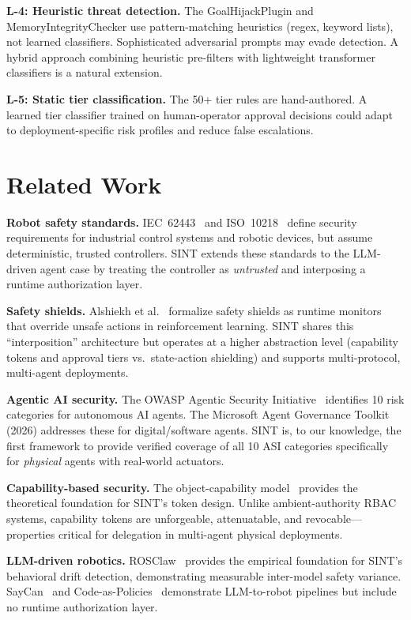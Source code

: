 \documentclass[conference]{IEEEtran}
\begin{document}
\textbf{L-4: Heuristic threat detection.}
The GoalHijackPlugin and MemoryIntegrityChecker use pattern-matching heuristics
(regex, keyword lists), not learned classifiers.
Sophisticated adversarial prompts may evade detection.
A hybrid approach combining heuristic pre-filters with lightweight transformer
classifiers is a natural extension.

\textbf{L-5: Static tier classification.}
The 50+ tier rules are hand-authored.
A learned tier classifier trained on human-operator approval decisions could
adapt to deployment-specific risk profiles and reduce false escalations.

\section{Related Work}
\label{sec:related}

\textbf{Robot safety standards.}
IEC~62443~\cite{iec62443} and ISO~10218~\cite{iso10218} define security
requirements for industrial control systems and robotic devices, but assume
deterministic, trusted controllers.
SINT extends these standards to the LLM-driven agent case by treating the
controller as \emph{untrusted} and interposing a runtime authorization layer.

\textbf{Safety shields.}
Alshiekh et al.~\cite{shields} formalize safety shields as runtime monitors
that override unsafe actions in reinforcement learning.
SINT shares this ``interposition'' architecture but operates at a higher
abstraction level (capability tokens and approval tiers vs.\ state-action
shielding) and supports multi-protocol, multi-agent deployments.

\textbf{Agentic AI security.}
The OWASP Agentic Security Initiative~\cite{owasp-asi} identifies 10 risk
categories for autonomous AI agents.
The Microsoft Agent Governance Toolkit (2026) addresses these for
digital/software agents.
SINT is, to our knowledge, the first framework to provide verified coverage
of all 10 ASI categories specifically for \emph{physical} agents with
real-world actuators.

\textbf{Capability-based security.}
The object-capability model~\cite{miller-ocap} provides the theoretical
foundation for SINT's token design.
Unlike ambient-authority RBAC systems, capability tokens are unforgeable,
attenuatable, and revocable---properties critical for delegation in multi-agent
physical deployments.

\textbf{LLM-driven robotics.}
ROSClaw~\cite{rosclaw} provides the empirical foundation for SINT's behavioral
drift detection, demonstrating measurable inter-model safety variance.
SayCan~\cite{saycan} and Code-as-Policies~\cite{codeaspolicies} demonstrate
LLM-to-robot pipelines but include no runtime authorization layer.
\end{document}
